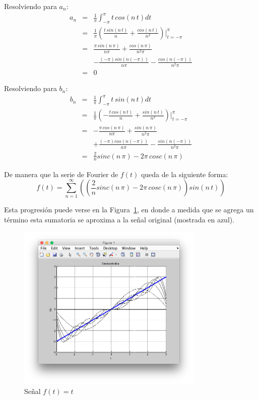 \documentclass[a4paper]{article}
\begin{document}
Resolviendo para $a_n$:
\begin{eqnarray*}
a_n &=& \frac{1}{\pi}\int_{-\pi}^{\pi}t\,cos(n\,t)dt\\
&=& \frac{1}{\pi} \left(\frac{t\,sin(n\,t)}{n} + \frac{cos(n\,t)}{n^2}\right)\bigg|_{t=-\pi}^{\pi}\\
&=& \frac{\pi\,sin(n\,\pi)}{n\pi} + \frac{cos(n\,\pi)}{n^2\pi}\\
& &- \frac{(-\pi)sin(n(-\pi))}{n\pi} - \frac{cos(n(-\pi))}{n^2\pi}\\
&=& 0
\end{eqnarray*}

Resolviendo para $b_n$:
\begin{eqnarray*}
b_n &=& \frac{1}{\pi}\int_{-\pi}^{\pi}t\,sin(n\,t)dt\\
&=& \frac{1}{\pi} \left(-\frac{t\,cos(n\,t)}{n} + \frac{sin(n\,t)}{n^2}\right)\bigg|_{t=-\pi}^{\pi}\\
&=& -\frac{\pi\,cos(n\,\pi)}{n\pi} + \frac{sin(n\,\pi)}{n^2\pi}\\
& & + \frac{(-\pi)cos(n(-\pi))}{n\pi} - \frac{sin(n(-\pi))}{n^2\pi}\\
&=& \frac{2}{n}sinc(n\,\pi) -2\pi\,cosc(n\,\pi)
\end{eqnarray*}

De manera que la serie de Fourier de $f(t)$ queda de la siguiente forma:
$$f(t) = \sum_{n=1}^\infty\left(\left(\frac{2}{n}sinc(n\,\pi) -2\pi\,cosc(n\,\pi)\right)sin(n\,t)\right)$$

Esta progresión puede verse en la Figura~\ref{fig_3}, en donde a medida que se agrega un término esta sumatoria se aproxima a la señal original (mostrada en azul).

\begin{figure}[!t]
\centering
\includegraphics[width=3.5in]{imgs/lin.png}
\caption{Señal $f(t) = t$}
\label{fig_3}
\end{figure}
\end{document}
